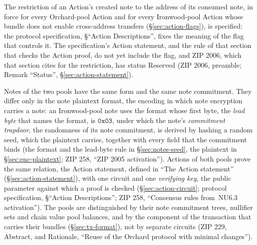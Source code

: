 \documentclass[11pt,a4paper]{article}
\theoremstyle{definition}
\begin{document}
The restriction of an Action's created note to the address of its consumed
note, in force for every Orchard-pool Action and for every Ironwood-pool
Action whose bundle does not enable cross-address transfers
(\S\ref{sec:action-flags}), is specified: the protocol specification,
\S``Action Descriptions'', fixes the meaning of the flag that controls it.
The specification's Action statement, and the rule of that section that
checks the Action proof, do not yet include the flag, and ZIP 2006, which
that section cites for the restriction, has status Reserved (ZIP 2006,
preamble; Remark ``Status'', \S\ref{sec:action-statement}).

Notes of the two pools have the same form and the same note commitment. They
differ only in the note plaintext format, the encoding in which note encryption
carries a note: an Ironwood-pool note uses the format whose first byte, the
\emph{lead byte} that names the format, is $\mathtt{0x03}$, under which the
note's \emph{commitment trapdoor}, the randomness of its note commitment, is
derived by hashing a random seed, which the plaintext carries, together with
every field that the commitment binds (the format and
the lead-byte rule in \S\ref{sec:notes-seed}, the plaintext in
\S\ref{sec:enc-plaintext}; ZIP 258, ``ZIP 2005 activation''). Actions of both
pools prove the same relation, the Action statement, defined in ``The Action
statement'' (\S\ref{sec:action-statement}), with one circuit and one
\emph{verifying key}, the public parameter against which a proof is checked
(\S\ref{sec:action-circuit}; protocol specification, \S``Action Descriptions'';
ZIP 258, ``Consensus rules from~NU6.3 activation''). The pools are distinguished
by their note commitment trees, nullifier sets and chain value pool balances,
and by the component of the transaction that carries their bundles
(\S\ref{sec:tx-format}), not by separate circuits (ZIP 229, Abstract, and
Rationale, ``Reuse of the Orchard protocol with minimal changes'').
\end{document}

